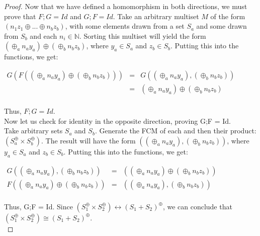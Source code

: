 \begin{lemma}
\begin{proof}
Now that we have defined a homomorphism in both directions, we must
prove that $F;G = Id$ and $G;F = Id$. Take an arbitrary multiset $M$
of the form $(n_1z_1 \oplus ... \oplus n_bz_b)$, with some elements
drawn from a set $S_a$ and some drawn from $S_b$ and each $n_i \in
\mathbb{N}$. Sorting this multiset will yield the form $(\oplus_a n_a
y_a) \oplus (\oplus_b n_b z_b)$, where $y_a \in S_a$ and $z_b \in
S_b$. Putting this into the functions, we get:
\begin{center}
  \begin{math}
    \begin{array}{lll}
      G(F((\oplus_a n_a y_a) \oplus (\oplus_b n_b z_b)))
      & = & G((\oplus_a n_a y_a), (\oplus_b n_b z_b))\\
      & = & (\oplus_a n_a y_a) \oplus (\oplus_b n_b z_b)\\
    \end{array}
  \end{math}
\end{center}
Thus, $F;G = Id$.\\

Now let us check for identity in the opposite direction, proving G;F = Id.\\
Take arbitrary sets $S_a$ and $S_b$. Generate the FCM of each and then their product: $(S_a^\oplus \times S_b^\oplus)$. The result will have the form $((\oplus_a n_a y_a), (\oplus_b n_b z_b))$, where $y_a \in S_a$ and $z_b \in S_b$. Putting this into the functions, we get:\\
\begin{center}
  \begin{math}
    \begin{array}{lll}
     G((\oplus_a n_a y_a), (\oplus_b n_b z_b)) & = & ((\oplus_a n_a y_a) \oplus (\oplus_b n_b z_b)) \\
     F((\oplus_a n_a y_a) \oplus (\oplus_b n_b z_b)) & = & ((\oplus_a n_a y_a), (\oplus_b n_b z_b))\\
    \end{array}
  \end{math}
\end{center}
 
Thus, G;F = Id. 
Since $(S_1 ^\oplus \times S_2 ^\oplus) \leftrightarrow (S_1 + S_2)^\oplus$, we can conclude that $(S_1 ^\oplus \times S_2 ^\oplus) \cong (S_1 + S_2)^\oplus$.\\
\end{proof}
%
\end{lemma}
%
